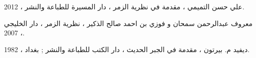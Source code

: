 \documentclass{arabicClass}
\begin{document}
	
	\abovedisplayskip=7pt
	\belowdisplayskip=7pt
	
	
	\amirifont
	
	
	
\arabicfont
	\tableofcontents
	\clearpage
	
	
	
	
	
	
	
	
	
	\begin{thebibliography}{9}
علي حسن التميمي ، مقدمة في نظرية الزمر ، دار المسيرة للطباعة والنشر ، 2012.

معروف عبدالرحمن سمحان و فوزي بن احمد صالح الذكير ، نظرية الزمر ، دار الخليجي ، 2007.

ديفيد م. بيرتون ، مقدمة في الجبر الحديث ، دار الكتب للطباعة والنشر ; بغداد ، 1982.
	\end{thebibliography}
	
	
\end{document}
